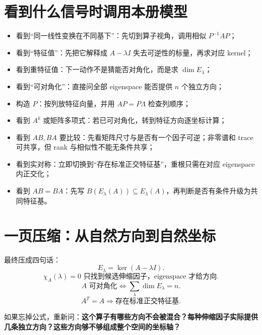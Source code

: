 \documentclass[11pt,a4paper]{ctexart}
\newcommand{\kw}[1]{\textbf{\color{deep}#1}}
\begin{document}
\section{看到什么信号时调用本册模型}

\begin{itemize}
  \item 看到“同一线性变换在不同基下”：先切到算子视角，调用相似 $P^{-1}AP$；
  \item 看到“特征值”：先把它解释成 $A-\lambda I$ 失去可逆性的标量，再求对应 kernel；
  \item 看到重特征值：下一动作不是猜能否对角化，而是求 $\dim E_\lambda$；
  \item 看到“可对角化”：直接问全部 eigenspace 能否提供 $n$ 个独立方向；
  \item 构造 $P$：按列放特征向量，并用 $AP=P\Lambda$ 检查列顺序；
  \item 看到 $A^k$ 或矩阵多项式：若已可对角化，转到特征方向逐坐标计算；
  \item 看到 $AB,BA$ 要比较：先看矩阵尺寸与是否有一个因子可逆；非零谱和 trace 可共享，但 rank 与相似性不能无条件共享；
  \item 看到实对称：立即切换到“存在标准正交特征基”，重根只需在对应 eigenspace 内正交化；
  \item 看到 $AB=BA$：先写 $B(E_\lambda(A))\subseteq E_\lambda(A)$，再判断是否有条件升级为共同特征基。
\end{itemize}

\section{一页压缩：从自然方向到自然坐标}

\begin{center}
\end{center}

最终压成四句话：
\[
\boxed{E_\lambda=\ker(A-\lambda I).}
\]
\[
\boxed{\chi_A(\lambda)=0\text{ 只找到候选伸缩因子，eigenspace 才给方向}.}
\]
\[
\boxed{A\text{ 可对角化}\iff\sum_\lambda\dim E_\lambda=n.}
\]
\[
\boxed{A^T=A\Longrightarrow\text{存在标准正交特征基}.}
\]

如果忘掉公式，重新问：\kw{这个算子有哪些方向不会被混合？每种伸缩因子实际提供几条独立方向？这些方向够不够组成整个空间的坐标轴？}
\end{document}
